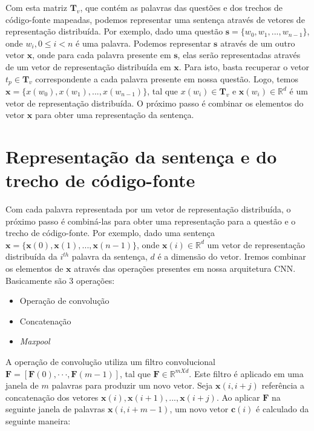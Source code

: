 Com esta matriz $\bm{T}_{v}$, que contém as palavras das questões e dos trechos de código-fonte mapeadas, podemos representar uma sentença através de vetores de representação distribuída. Por exemplo, dado uma questão $\bm{s} = \{ w_{0}, w_{1}, . . ., w_{n - 1}\}$, onde $w_{i}, 0 \leq i < n$ é uma palavra. Podemos representar $\bm{s}$ através de um outro vetor $\bm{x}$, onde para cada palavra presente em $\bm{s}$, elas serão representadas através de um vetor de representação distribuída em $\bm{x}$. Para isto, basta recuperar o vetor $t_{p} \in \bm{T}_{v}$ correspondente a cada palavra presente em nossa questão. Logo, temos $\bm{x} = \{ x(w_{0}), x(w_{1}), . . ., x(w_{n - 1})\}$, tal que $x(w_{i}) \in \bm{T}_{v}$ e $\bm{x}(w_{i}) \in \mathbb{R}^{d}$ é um vetor de representação distribuída. O próximo passo é combinar os elementos do vetor $\bm{x}$ para obter uma representação da sentença.





\section{Representação da sentença e do trecho de código-fonte}
\label{sec:representacao-sentenca}

Com cada palavra representada por um vetor de representação distribuída, o próximo passo é combiná-las para obter uma representação para a questão e o trecho de código-fonte. Por exemplo, dado uma sentença $\bm{x} = \{ \bm{x}(0), \bm{x}(1), . . ., \bm{x}(n - 1) \}$, onde $\bm{x}(i) \in \mathbb{R}^{d}$ um vetor de representação distribuída da $i^{th}$ palavra da sentença, $d$ é a dimensão do vetor. Iremos combinar os elementos de $\bm{x}$ através das operações presentes em nossa arquitetura CNN. Basicamente são 3 operações:

\begin{itemize}
    \item Operação de convolução
    \item Concatenação
    \item \textit{Maxpool}
\end{itemize}

A operação de convolução utiliza um filtro convolucional $\bm{F}  = [\bm{F}(0),· · ·, \bm{F}(m - 1)]$, tal que $\bm{F} \in \mathbb{R}^{m X d}$. Este filtro é aplicado em uma janela de $m$ palavras para produzir um novo vetor.
Seja $\bm{x}(i, i + j)$ referência a concatenação dos vetores $\bm{x}(i), \bm{x}(i + 1), . . ., \bm{x}(i + j)$. Ao aplicar $\bm{F}$ na seguinte janela de palavras $\bm{x}(i, i + m - 1)$, um novo vetor $\bm{c}(i)$ é calculado da seguinte maneira:

